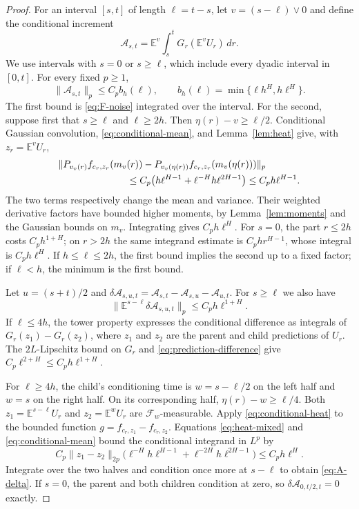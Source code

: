 \documentclass[11pt]{article}
\theoremstyle{remark}
\newcommand{\E}{\mathbb E}
\newcommand{\F}{\mathcal F}
\newcommand{\Acal}{\mathcal A}
\newcommand{\norm}[1]{\lVert#1\rVert}
\begin{document}
\begin{proof}
For an interval \([s,t]\) of length \(\ell=t-s\), let
\(v=(s-\ell)\vee0\) and define the conditional increment
\begin{equation}\label{eq:A}
 \Acal_{s,t}=\E^v\int_s^tG_r(\E^v U_r)\,dr.
\end{equation}
We use intervals with \(s=0\) or \(s\ge\ell\), which include every
dyadic interval in \([0,t]\). For every fixed \(p\ge1\),
\begin{equation}\label{eq:A-size}
 \norm{\Acal_{s,t}}_p
 \le C_p b_h(\ell),\qquad
 b_h(\ell)=\min\{\ell h^H,h\ell^H\}.
\end{equation}
The first bound is \eqref{eq:F-noise} integrated over the interval.
For the second, suppose first that \(s\ge\ell\) and \(\ell\ge2h\).
Then \(\eta(r)-v\ge\ell/2\). Conditional Gaussian convolution,
\eqref{eq:conditional-mean}, and Lemma~\ref{lem:heat} give, with
\(z_r=\E^v U_r\),
\[
 \begin{split}
 &\norm{P_{v_v(r)}f_{c_r,z_r}(m_v(r))
       -P_{v_v(\eta(r))}f_{c_r,z_r}(m_v(\eta(r)))}_p\\
 &\hspace{25mm}\le
 C_p\bigl(h\ell^{H-1}+\ell^{-H}h\ell^{2H-1}\bigr)
 \le C_ph\ell^{H-1}.
 \end{split}
\]
The two terms respectively change the mean and variance.
Their weighted derivative factors have bounded higher moments, by
Lemma~\ref{lem:moments} and the Gaussian bounds on \(m_v\).
Integrating gives \(C_ph\ell^H\). For \(s=0\), the part \(r\le2h\)
costs \(C_ph^{1+H}\); on \(r>2h\) the same integrand estimate is
\(C_ph r^{H-1}\), whose integral is \(C_ph\ell^H\).
If \(h\le\ell\le2h\), the first bound implies the second up to a
fixed factor; if \(\ell<h\), the minimum is the first bound.

Let \(u=(s+t)/2\) and
\(\delta\Acal_{s,u,t}=\Acal_{s,t}-\Acal_{s,u}-\Acal_{u,t}\).
For \(s\ge\ell\) we also have
\begin{equation}\label{eq:A-delta}
 \norm{\E^{s-\ell}\delta\Acal_{s,u,t}}_p
 \le C_ph\ell^{1+H}.
\end{equation}
If \(\ell\le4h\), the tower property expresses the conditional
difference as integrals of \(G_r(z_1)-G_r(z_2)\), where \(z_1\)
and \(z_2\) are the parent and child predictions of \(U_r\).
The \(2L\)-Lipschitz bound on \(G_r\) and
\eqref{eq:prediction-difference} give
\(C_p\ell^{2+H}\le C_ph\ell^{1+H}\).

For \(\ell\ge4h\), the child's conditioning time is
\(w=s-\ell/2\) on the left half and \(w=s\) on the right half.
On its corresponding half, \(\eta(r)-w\ge\ell/4\).
Both \(z_1=\E^{s-\ell}U_r\) and \(z_2=\E^wU_r\) are
\(\F_w\)-measurable. Apply \eqref{eq:conditional-heat} to the bounded
function \(g=f_{c_r,z_1}-f_{c_r,z_2}\).
Equations \eqref{eq:heat-mixed} and \eqref{eq:conditional-mean}
bound the conditional integrand in \(L^p\) by
\[
 C_p\norm{z_1-z_2}_{2p}
       \bigl(\ell^{-H}h\ell^{H-1}
                    +\ell^{-2H}h\ell^{2H-1}\bigr)
 \le C_ph\ell^H.
\]
Integrate over the two halves and condition once more at \(s-\ell\)
to obtain \eqref{eq:A-delta}. If \(s=0\), the parent and both children
condition at zero, so \(\delta\Acal_{0,t/2,t}=0\) exactly.


\end{proof}
\end{document}

